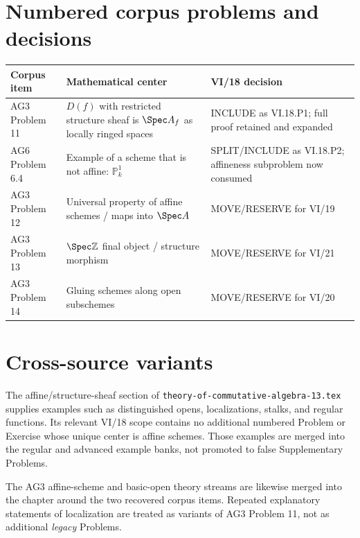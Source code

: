 \section*{Numbered corpus problems and decisions}
\begin{center}
\begin{tabular}{p{}p{}p{}}
\toprule
Corpus item & Mathematical center & VI/18 decision\\
\midrule
AG3 Problem 11 & $D(f)$ with restricted structure sheaf is $\Spec A_f$ as locally ringed spaces & INCLUDE as VI.18.P1; full proof retained and expanded\\
AG6 Problem 6.4 & Example of a scheme that is not affine: $\mathbb P^1_k$ & SPLIT/INCLUDE as VI.18.P2; affineness subproblem now consumed\\
AG3 Problem 12 & Universal property of affine schemes / maps into $\Spec A$ & MOVE/RESERVE for VI/19\\
AG3 Problem 13 & $\Spec\mathbb Z$ final object / structure morphism & MOVE/RESERVE for VI/21\\
AG3 Problem 14 & Gluing schemes along open subschemes & MOVE/RESERVE for VI/20\\
\bottomrule
\end{tabular}
\end{center}

\section*{Cross-source variants}
The affine/structure-sheaf section of \texttt{theory-of-commutative-algebra-13.tex} supplies
examples such as distinguished opens, localizations, stalks, and regular functions.  Its
relevant VI/18 scope contains no additional numbered Problem or Exercise whose unique center
is affine schemes.  Those examples are merged into the regular and advanced example banks,
not promoted to false Supplementary Problems.

The AG3 affine-scheme and basic-open theory streams are likewise merged into the chapter
around the two recovered corpus items.  Repeated explanatory statements of localization are
treated as variants of AG3 Problem 11, not as additional \emph{legacy} Problems.

